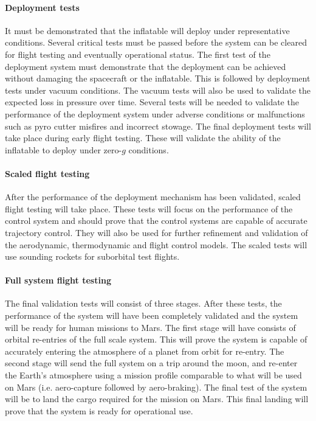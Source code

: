 \paragraph{Deployment tests}
It must be demonstrated that the inflatable will deploy under representative conditions. Several critical tests must be passed before the system can be cleared for flight testing and eventually operational status. The first test of the deployment system must demonstrate that the deployment can be achieved without damaging the spacecraft or the inflatable. This is followed by deployment tests under vacuum conditions. The vacuum tests will also be used to validate the expected loss in pressure over time. Several tests will be needed to validate the performance of the deployment system under adverse conditions or malfunctions such as pyro cutter misfires and incorrect stowage. The final deployment tests will take place during early flight testing. These will validate the ability of the inflatable to deploy under zero-$g$ conditions. 

\paragraph{Scaled flight testing}
After the performance of the deployment mechanism has been validated, scaled flight testing will take place. These tests will focus on the  performance of the control system and should prove that the control systems are capable of accurate trajectory control. They will also be used for further refinement and validation of the aerodynamic, thermodynamic and flight control models.  The scaled tests will use sounding rockets for suborbital test flights.

\paragraph{Full system flight testing}
The final validation tests will consist of three stages. After these tests, the performance of the system will have been completely validated and the system will be ready for human missions to Mars. The first stage will have consists of orbital re-entries of the full scale system. This will prove the system is capable of accurately entering the atmosphere of a  planet from orbit for re-entry. The second stage will send the full system on a trip around the moon, and re-enter the Earth's atmosphere using a mission profile comparable to what will be used on Mars (i.e. aero-capture followed by aero-braking). The final test of the system will be to land the cargo required for the mission on Mars. This final landing will prove that the system is ready for operational use. 




